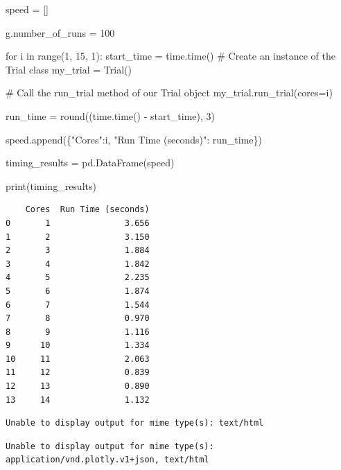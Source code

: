 \documentclass[
  letterpaper,
  DIV=11,
  numbers=noendperiod]{scrreprt}
\newenvironment{Shaded}{}{}
\newcommand{\BuiltInTok}[1]{\textcolor[rgb]{0.84,0.23,0.29}{#1}}
\newcommand{\CommentTok}[1]{\textcolor[rgb]{0.42,0.45,0.49}{#1}}
\newcommand{\ControlFlowTok}[1]{\textcolor[rgb]{0.84,0.23,0.29}{#1}}
\newcommand{\DecValTok}[1]{\textcolor[rgb]{0.00,0.36,0.77}{#1}}
\newcommand{\KeywordTok}[1]{\textcolor[rgb]{0.84,0.23,0.29}{#1}}
\newcommand{\NormalTok}[1]{\textcolor[rgb]{0.14,0.16,0.18}{#1}}
\newcommand{\OperatorTok}[1]{\textcolor[rgb]{0.14,0.16,0.18}{#1}}
\newcommand{\StringTok}[1]{\textcolor[rgb]{0.01,0.18,0.38}{#1}}
\begin{document}
\begin{Shaded}
\begin{Highlighting}[]
\NormalTok{speed }\OperatorTok{=}\NormalTok{ []}

\NormalTok{g.number\_of\_runs }\OperatorTok{=} \DecValTok{100}

\ControlFlowTok{for}\NormalTok{ i }\KeywordTok{in} \BuiltInTok{range}\NormalTok{(}\DecValTok{1}\NormalTok{, }\DecValTok{15}\NormalTok{, }\DecValTok{1}\NormalTok{):}
\NormalTok{    start\_time }\OperatorTok{=}\NormalTok{ time.time()}
    \CommentTok{\# Create an instance of the Trial class}
\NormalTok{    my\_trial }\OperatorTok{=}\NormalTok{ Trial()}

    \CommentTok{\# Call the run\_trial method of our Trial object}
\NormalTok{    my\_trial.run\_trial(cores}\OperatorTok{=}\NormalTok{i)}

\NormalTok{    run\_time }\OperatorTok{=} \BuiltInTok{round}\NormalTok{((time.time() }\OperatorTok{{-}}\NormalTok{ start\_time), }\DecValTok{3}\NormalTok{)}

\NormalTok{    speed.append(\{}\StringTok{"Cores"}\NormalTok{:i, }\StringTok{"Run Time (seconds)"}\NormalTok{: run\_time\})}

\NormalTok{timing\_results }\OperatorTok{=}\NormalTok{ pd.DataFrame(speed)}

\BuiltInTok{print}\NormalTok{(timing\_results)}
\end{Highlighting}
\end{Shaded}

\begin{verbatim}
    Cores  Run Time (seconds)
0       1               3.656
1       2               3.150
2       3               1.884
3       4               1.842
4       5               2.235
5       6               1.874
6       7               1.544
7       8               0.970
8       9               1.116
9      10               1.334
10     11               2.063
11     12               0.839
12     13               0.890
13     14               1.132
\end{verbatim}

\begin{verbatim}
Unable to display output for mime type(s): text/html
\end{verbatim}

\begin{verbatim}
Unable to display output for mime type(s): application/vnd.plotly.v1+json, text/html
\end{verbatim}
\end{document}
